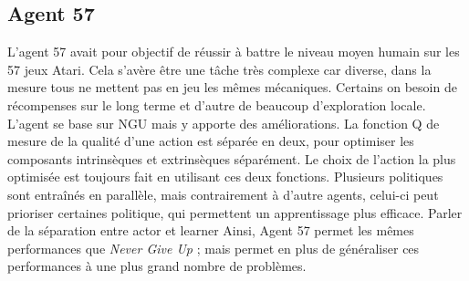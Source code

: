 \documentclass[a4paper,12pt]{report}
\begin{document}
\subsection{Agent 57 \cite{agent57}}
\indent L'agent 57 avait pour objectif de réussir à battre le niveau moyen humain sur les 57 jeux Atari. Cela s'avère être une tâche très complexe car diverse, dans la mesure tous ne mettent pas en jeu les mêmes mécaniques. Certains on besoin de récompenses sur le long terme et d’autre de beaucoup d’exploration locale.
\newline \indent L’agent se base sur NGU mais y apporte des améliorations. La fonction Q de mesure de la qualité d’une action est séparée en deux, pour optimiser les composants intrinsèques et extrinsèques séparément. Le choix de l’action la plus optimisée est toujours fait en utilisant ces deux fonctions.
\newline \indent Plusieurs politiques sont entraînés en parallèle, mais contrairement à d’autre agents, celui-ci peut prioriser certaines politique, qui permettent un apprentissage plus efficace.
\newline
\newline \indent  Parler de la séparation entre actor et learner
\newline
\newline \indent Ainsi, Agent 57 permet les mêmes performances que \textit{Never Give Up} ; mais permet en plus de généraliser ces performances à une plus grand nombre de problèmes.
\end{document}
